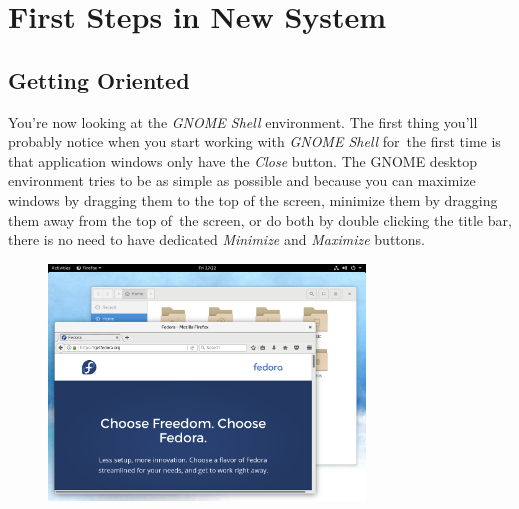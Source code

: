 \chapter*{First Steps in New System}
\section*{Getting Oriented}

You're now looking at the \emph{GNOME Shell} environment. The first thing you'll probably notice when you start working with \emph{GNOME Shell} for~the first time is that application windows only have the \emph{Close} button. The GNOME desktop environment tries to be as simple as possible and because you can maximize windows by dragging them to the top of the screen, minimize them by dragging them away from the top of~the screen, or do both by double clicking the title bar, there is no need to have dedicated \emph{Minimize} and \emph{Maximize} buttons.

\bigskip

\begin{figure}[htbp]
\begin{center}
\includegraphics[width=0.75\textwidth]{img/shell-a}
 \label{fig:shell-a}
\end{center}
\end{figure}

